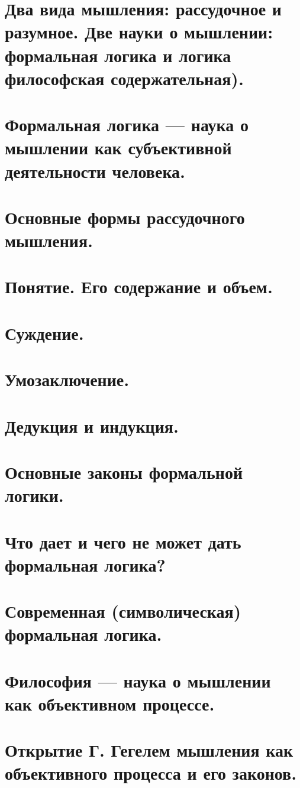 \section{ Два вида мышления: рассудочное и разумное. Две науки о мышлении: формальная логика и логика философская содержательная).}
\section{ Формальная логика — наука о мышлении как субъективной деятельности человека.}
\section{ Основные формы рассудочного мышления.}
\section{ Понятие. Его содержание и объем.}
\section{ Суждение.}
\section{ Умозаключение.}
\section{ Дедукция и индукция.}
\section{ Основные законы формальной логики.}
\section{ Что дает и чего не может дать формальная логика?}
\section{ Современная (символическая) формальная логика.}
\section{ Философия — наука о мышлении как объективном процессе.}
\section{ Открытие Г. Гегелем мышления как объективного процесса и его законов.}
